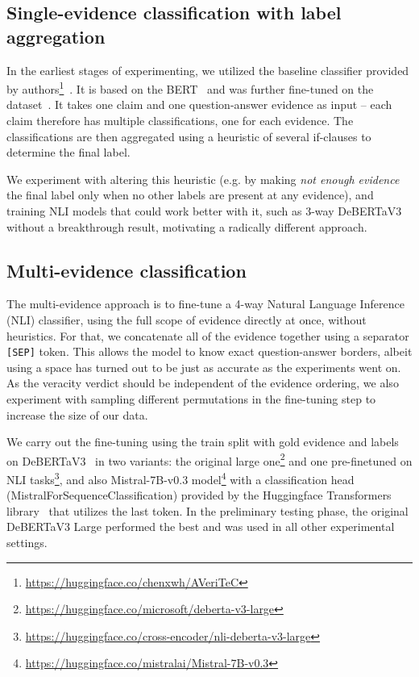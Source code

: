 \subsection{Single-evidence classification with label aggregation}
In the earliest stages of experimenting, we utilized the baseline classifier provided by \averitec{} authors\footnote{\url{https://huggingface.co/chenxwh/AVeriTeC}}~\cite{averitec2024}.
It is based on the BERT~\cite{devlin-etal-2019-bert} and was further fine-tuned on the \averitec{}  dataset~\cite{averitec2024}. 
It takes one claim and one question-answer evidence as input -- each claim therefore has multiple classifications, one for each evidence. The classifications are then aggregated using a heuristic of several if-clauses to determine the final label. 

We experiment with altering this heuristic (e.g. by making \textit{not enough evidence} the final label only when no other labels are present at any evidence), and training NLI models that could work better with it, such as 3-way DeBERTaV3~\cite{he2023debertav3improvingdebertausing} without a breakthrough result, motivating a radically different approach.

\subsection{Multi-evidence classification}
\label{subsubsec:concatenation}
The multi-evidence approach is to fine-tune a 4-way Natural Language Inference (NLI) classifier, using the full scope of evidence directly at once, without heuristics.
For that, we concatenate all of the evidence together using a separator \texttt{[SEP]} token. This allows the model to know exact question-answer borders, albeit using a space has turned out to be just as accurate as the experiments went on. As the veracity verdict should be independent of the evidence ordering, we also experiment with sampling different permutations in the fine-tuning step to increase the size of our data.

We carry out the fine-tuning using the \averitec{} train split with gold evidence and labels on \mbox{DeBERTaV3}~\cite{he2023debertav3improvingdebertausing} in two variants: the original large one\footnote{\url{https://huggingface.co/microsoft/deberta-v3-large}} and one pre-finetuned on NLI tasks\footnote{\url{https://huggingface.co/cross-encoder/nli-deberta-v3-large}}, and also Mistral-7B-v0.3 model\footnote{\url{https://huggingface.co/mistralai/Mistral-7B-v0.3}} with a classification head (MistralForSequenceClassification) provided by the Huggingface Transformers library~\cite{wolf-etal-2020-transformers} that utilizes the last token. In the preliminary testing phase, the original DeBERTaV3 Large performed the best and was used in all other experimental settings.


